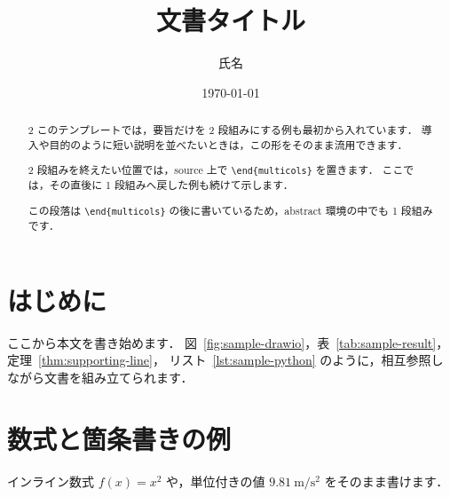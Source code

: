 \documentclass[12pt,a4paper,titlepage]{ltjsarticle}
\title{文書タイトル}
\author{氏名}
\date{\today}
\theoremstyle{plain}
\theoremstyle{definition}
\theoremstyle{remark}
\begin{document}
\hypersetup{pageanchor=false}
% 
\maketitle

\begin{abstract}
    \begin{multicols}{2}
        このテンプレートでは，要旨だけを 2 段組みにする例も最初から入れています．
        導入や目的のように短い説明を並べたいときは，この形をそのまま流用できます．

        2 段組みを終えたい位置では，source 上で \verb|\end{multicols}| を置きます．
        ここでは，その直後に 1 段組みへ戻した例も続けて示します．
    \end{multicols}
    この段落は \verb|\end{multicols}| の後に書いているため，abstract 環境の中でも 1 段組みです．
\end{abstract}

\clearpage
\tableofcontents
\thispagestyle{empty}
\clearpage

\hypersetup{pageanchor=true}

\section{はじめに}
ここから本文を書き始めます．
図~\ref{fig:sample-drawio}，表~\ref{tab:sample-result}，定理~\ref{thm:supporting-line}，
リスト~\ref{lst:sample-python} のように，相互参照しながら文書を組み立てられます．

\section{数式と箇条書きの例}
インライン数式 \(f(x)=x^2\) や，単位付きの値 \(\SI{9.81}{\metre\per\second\squared}\) をそのまま書けます．
\end{document}
